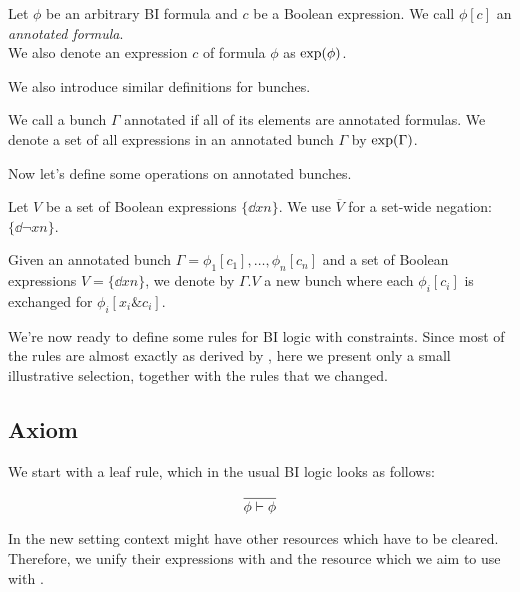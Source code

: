 \begin{definition}
  Let \(\phi\) be an arbitrary BI formula and \(c\) be a Boolean expression.
  We call \(\phi[c]\) an \emph{annotated formula}.\\
  We also denote an expression \(c\) of formula \(\phi\) as \(\text{exp}(\phi)\).
\end{definition}

We also introduce similar definitions for bunches.

\begin{definition}
  We call a bunch \(\Gamma\) annotated if all of its elements are annotated formulas.
  We denote a set of all expressions in an annotated bunch \(\Gamma\) by \(\text{exp}(\Gamma)\).
\end{definition}

Now let's define some operations on annotated bunches.

\begin{definition}
  Let \(V\) be a set of Boolean expressions \(\{\dd {x} {n}\}\).
  We use \(\overline{V}\) for a set-wide negation: \(\{\dd {\neg {x}} {n}\}\).
\end{definition}

\begin{definition}
  Given an annotated bunch \(\Gamma = \phi_1[c_1],\ldots,\phi_n[c_n]\) and a set of Boolean expressions \(V = \{\dd {x} {n}\}\), we denote by \(\Gamma . V\) a new bunch where each \(\phi_i[c_i]\) is exchanged for \(\phi_i[x_i \& c_i]\).
\end{definition}

We're now ready to define some rules for BI logic with constraints.
Since most of the rules are almost exactly as derived by \citet{harlandResourceDistributionBooleanConstraints2003}, here we present only a small illustrative selection, together with the rules that we changed.

\subsection{Axiom}

We start with a leaf rule, which in the usual BI logic looks as follows:

\[\infer{\phi \vdash \phi}{}\]

In the new setting context might have other resources which have to be cleared.
Therefore, we unify their expressions with \false and the resource which we aim to use with \true.

